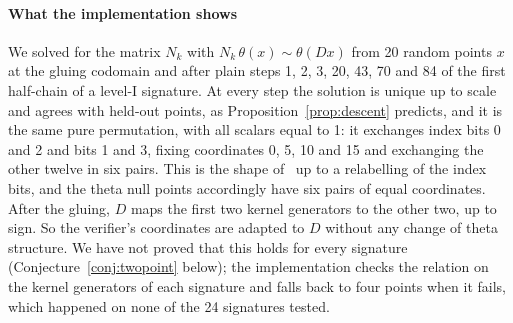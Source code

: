 \paragraph{What the implementation shows}
We solved for the matrix $N_k$ with $N_k\,\theta(x) \sim \theta(Dx)$ from
20 random points $x$ at the gluing codomain and after plain steps 1, 2, 3,
20, 43, 70 and 84 of the first half-chain of a level-I signature. At every
step the solution is unique up to scale and agrees with held-out points,
as Proposition~\ref{prop:descent} predicts, and it is the same pure
permutation, with all scalars equal to 1: it exchanges index bits 0 and 2
and bits 1 and 3, fixing coordinates 0, 5, 10 and 15 and exchanging the
other twelve in six pairs. This is the shape of~\cite[Proposition
G.3]{BDD+26} up to a relabelling of the index bits, and the theta null
points accordingly have six pairs of equal coordinates. After the gluing,
$D$ maps the first two kernel generators to the other two, up to sign. So
the verifier's coordinates are adapted to $D$ without any change of theta
structure. We have not proved that this holds for every signature
(Conjecture~\ref{conj:twopoint} below); the implementation checks the relation on the kernel generators of each
signature and falls back to four points when it fails, which happened on
none of the 24 signatures tested.

